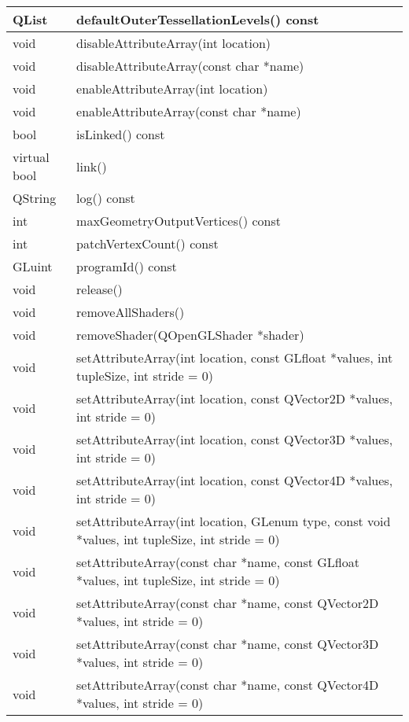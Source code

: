 \begin{longtable}[l]{|l|m{34em}|}
    \hline
    QList	&defaultOuterTessellationLevels() const \\ 
    \hline
    void	&disableAttributeArray(int location) \\ 
    \hline
    void	&disableAttributeArray(const char *name) \\ 
    \hline
    void	&enableAttributeArray(int location) \\ 
    \hline
    void	&enableAttributeArray(const char *name) \\ 
    \hline
    bool	&isLinked() const \\  
    \hline
    virtual bool&	link() \\ 
    \hline
    QString&	log() const \\ 
    \hline
    int &	maxGeometryOutputVertices() const  \\ 
    \hline
    int	 &patchVertexCount() const \\ 
    \hline
    GLuint &	programId() const \\ 
    \hline
    void	&release() \\ 
    \hline
    void	&removeAllShaders() \\
    \hline
    void	&removeShader(QOpenGLShader *shader) \\ 
    \hline
    void	&setAttributeArray(int location, const GLfloat *values, int tupleSize, int stride = 0) \\ 
    \hline
    void	&setAttributeArray(int location, const QVector2D *values, int stride = 0) \\ 
    \hline
    void	&setAttributeArray(int location, const QVector3D *values, int stride = 0) \\ 
    \hline
    void	&setAttributeArray(int location, const QVector4D *values, int stride = 0) \\ 
    \hline
    void	&setAttributeArray(int location, GLenum type, const void *values, int tupleSize, int stride = 0) \\ 
    \hline
    void	&setAttributeArray(const char *name, const GLfloat *values, int tupleSize, int stride = 0) \\ 
    \hline
    void	&setAttributeArray(const char *name, const QVector2D *values, int stride = 0) \\ 
    \hline
    void	&setAttributeArray(const char *name, const QVector3D *values, int stride = 0) \\ 
    \hline
    void	&setAttributeArray(const char *name, const QVector4D *values, int stride = 0) \\
    \hline

\end{longtable}
